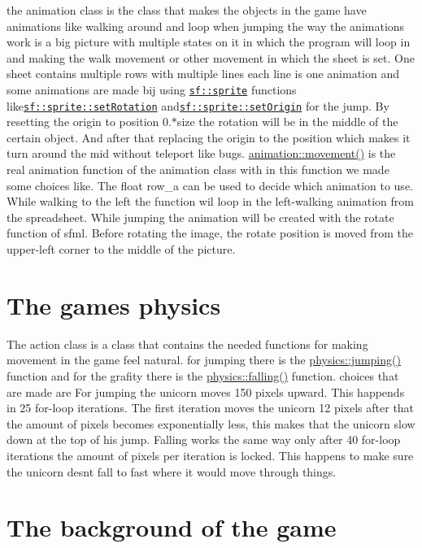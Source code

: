 the animation class is the class that makes the objects in the game have animations like walking around and loop when jumping the way the animations work is a big picture with multiple states on it in which the program will loop in and making the walk movement or other movement in which the sheet is set. One sheet contains multiple rows with multiple lines each line is one animation and some animations are made bij using \href{https://www.sfml-dev.org/documentation/2.0/classsf_1_1Sprite.php}{\tt sf\+::sprite} functions like\href{https://www.sfml-dev.org/documentation/2.0/classsf_1_1Transformable.php#a32baf2bf1a74699b03bf8c95030a38ed}{\tt sf\+::sprite\+::set\+Rotation} and\href{https://www.sfml-dev.org/documentation/2.0/classsf_1_1Transformable.php#aa93a835ffbf3bee2098dfbbc695a7f05}{\tt sf\+::sprite\+::set\+Origin} for the jump. By resetting the origin to position 0.$\ast$size the rotation will be in the middle of the certain object. And after that replacing the origin to the position which makes it turn around the mid without teleport like bugs. \hyperlink{classanimation_af213ade7eb27bba8337ec6223c73f945}{animation\+::movement()} is the real animation function of the animation class with in this function we made some choices like. The float row\+\_\+a can be used to decide which animation to use. While walking to the left the function wil loop in the left-\/walking animation from the spreadsheet. While jumping the animation will be created with the rotate function of sfml. Before rotating the image, the rotate position is moved from the upper-\/left corner to the middle of the picture.\hypertarget{index_physics}{}\section{The game\textquotesingle{}s physics}\label{index_physics}
The action class is a class that contains the needed functions for making movement in the game feel natural. for jumping there is the \hyperlink{classphysics_aaf1c57aa6e35b9c83ccbfdfa8c18468c}{physics\+::jumping()} function and for the grafity there is the \hyperlink{classphysics_acca1ee2fb8b760b6e4ee61ae7c2ee3da}{physics\+::falling()} function. choices that are made are For jumping the unicorn moves 150 pixels upward. This happends in 25 for-\/loop iterations. The first iteration moves the unicorn 12 pixels after that the amount of pixels becomes exponentially less, this makes that the unicorn slow down at the top of his jump. Falling works the same way only after 40 for-\/loop iterations the amount of pixels per iteration is locked. This happens to make sure the unicorn desn\textquotesingle{}t fall to fast where it would move through things.\hypertarget{index_background}{}\section{The background of the game}\label{index_background}
